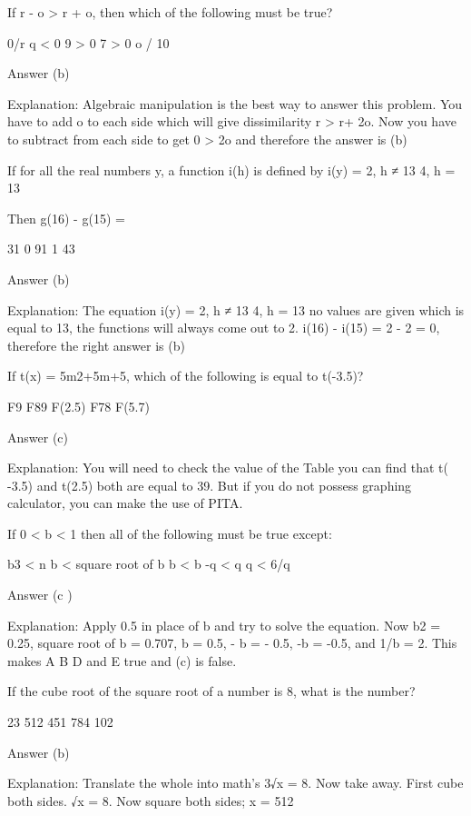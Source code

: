     If r - o > r + o, then which of the following must be true?

        0/r
        q < 0
        9 > 0
        7 > 0
        o / 10 

    Answer (b)

    Explanation: Algebraic manipulation is the best way to answer this problem. You have to add o to each side which will give dissimilarity r > r+ 2o. Now you have to subtract from each side to get 0 > 2o and therefore the answer is (b)

     

    If for all the real numbers y, a function i(h) is defined by i(y) = {2, h ≠ 13 4, h = 13}

    Then g(16) - g(15) =

        31
        0
        91
        1
        43 

    Answer (b)

    Explanation: The equation i(y) = {2, h ≠ 13 4, h = 13} no values are given which is equal to 13, the functions will always come out to 2. i(16) - i(15) = 2 - 2 = 0, therefore the right answer is (b)

    If t(x) = 5m2+5m+5, which of the following is equal to t(-3.5)?

        F9
        F89
        F(2.5)
        F78
        F(5.7) 

    Answer (c)

    Explanation: You will need to check the value of the Table you can find that t( -3.5) and t(2.5) both are equal to 39. But if you do not possess graphing calculator, you can make the use of PITA.

    If 0 < b < 1 then all of the following must be true except:

        b3 < n
        b < square root of b
        b < b
        -q < q
        q < 6/q 

    Answer (c )

    Explanation: Apply 0.5 in place of b and try to solve the equation. Now b2 = 0.25, square root of b = 0.707, b = 0.5, - b = - 0.5, -b = -0.5, and 1/b = 2. This makes A B D and E true and (c) is false.

    If the cube root of the square root of a number is 8, what is the number?

        23
        512
        451
        784
        102 

    Answer (b)

    Explanation: Translate the whole into math's 3√x = 8. Now take away. First cube both sides. √x = 8. Now square both sides; x = 512

